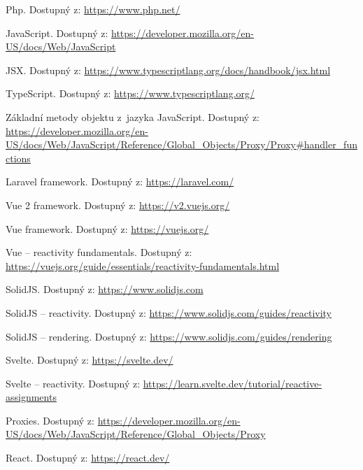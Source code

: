 \documentclass[
  master,
  program=ainf,
  printversion,
  tables=false,
  sourcecodes,
  glossaries,
  index
]{kidiplom}
\begin{document}
\begin{thebibliography}{9}
   Php. Dostupný z: \url{https://www.php.net/}

   JavaScript. Dostupný z: \url{https://developer.mozilla.org/en-US/docs/Web/JavaScript}

   JSX. Dostupný z: \url{https://www.typescriptlang.org/docs/handbook/jsx.html}

   TypeScript. Dostupný z: \url{https://www.typescriptlang.org/}
  
   Základní metody objektu z~jazyka JavaScript. Dostupný z: \url{https://developer.mozilla.org/en-US/docs/Web/JavaScript/Reference/Global_Objects/Proxy/Proxy#handler_functions}

   Laravel framework. Dostupný z: \url{https://laravel.com/}

   Vue 2 framework. Dostupný z: \url{https://v2.vuejs.org/}

   Vue framework. Dostupný z: \url{https://vuejs.org/}

   Vue -- reactivity fundamentals. Dostupný z: \url{https://vuejs.org/guide/essentials/reactivity-fundamentals.html}
  
   SolidJS. Dostupný z: \url{https://www.solidjs.com}

   SolidJS -- reactivity. Dostupný z: \url{https://www.solidjs.com/guides/reactivity}
  
   SolidJS -- rendering. Dostupný z: \url{https://www.solidjs.com/guides/rendering}
  
   Svelte. Dostupný z: \url{https://svelte.dev/}

   Svelte -- reactivity. Dostupný z: \url{https://learn.svelte.dev/tutorial/reactive-assignments}
   
   Proxies. Dostupný z: \url{https://developer.mozilla.org/en-US/docs/Web/JavaScript/Reference/Global_Objects/Proxy}

   React. Dostupný z: \url{https://react.dev/}
\end{thebibliography}

\printindex
\end{document}
